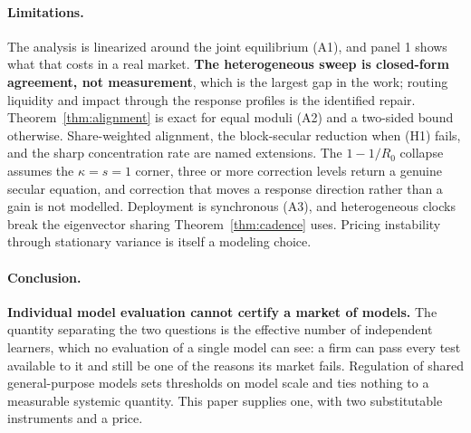 \documentclass{article}
\theoremstyle{plain}
\theoremstyle{definition}
\begin{document}
\paragraph{Limitations.}
The analysis is linearized around the joint equilibrium (A1), and panel 1 shows what that costs in a real market. \textbf{The heterogeneous sweep is closed-form agreement, not measurement}, which is the largest gap in the work; routing liquidity and impact through the response profiles is the identified repair. Theorem~\ref{thm:alignment} is exact for equal moduli (A2) and a two-sided bound otherwise. Share-weighted alignment, the block-secular reduction when (H1) fails, and the sharp concentration rate are named extensions. The $1-1/R_0$ collapse assumes the $\kappa=s=1$ corner, three or more correction levels return a genuine secular equation, and correction that moves a response direction rather than a gain is not modelled. Deployment is synchronous (A3), and heterogeneous clocks break the eigenvector sharing Theorem~\ref{thm:cadence} uses. Pricing instability through stationary variance is itself a modeling choice.

\paragraph{Conclusion.}
\textbf{Individual model evaluation cannot certify a market of models.} The quantity separating the two questions is the effective number of independent learners, which no evaluation of a single model can see: a firm can pass every test available to it and still be one of the reasons its market fails. Regulation of shared general-purpose models sets thresholds on model scale and ties nothing to a measurable systemic quantity. This paper supplies one, with two substitutable instruments and a price.
\end{document}
